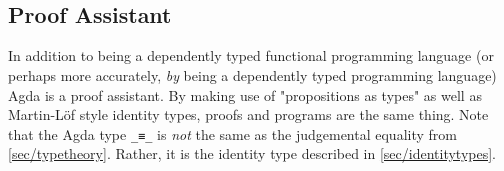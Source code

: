 \begin{code}%
\>[0]\AgdaOperator{\AgdaFunction{\AgdaUnderscore{}++\AgdaUnderscore{}}}\AgdaSpace{}%
\AgdaSymbol{:}\AgdaSpace{}%
\AgdaSymbol{\{}\AgdaSpace{}%
\AgdaSymbol{:}\AgdaSpace{}%
\AgdaSymbol{\}}\AgdaSpace{}%
\AgdaSymbol{\{}\AgdaSpace{}%
\AgdaSpace{}%
\AgdaSymbol{:}\AgdaSpace{}%
\AgdaSymbol{\}}\AgdaSpace{}%
\AgdaSpace{}%
\AgdaSpace{}%
\AgdaSpace{}%
\AgdaSpace{}%
\AgdaSpace{}%
\AgdaSpace{}%
\AgdaSpace{}%
\AgdaSpace{}%
\AgdaSpace{}%
\AgdaSpace{}%
\AgdaSpace{}%
\AgdaSymbol{(}\AgdaSpace{}%
\AgdaOperator{\AgdaFunction{+}}\AgdaSpace{}%
\AgdaSymbol{)}\<%
\\
\>[0]\AgdaInductiveConstructor{[]}\AgdaSpace{}%
\AgdaOperator{\AgdaFunction{++}}\AgdaSpace{}%
\AgdaSpace{}%
\AgdaSymbol{=}\AgdaSpace{}%
\<%
\\
\>[0]\AgdaSymbol{(}\AgdaSpace{}%
\AgdaOperator{\AgdaInductiveConstructor{::}}\AgdaSpace{}%
\AgdaSymbol{)}\AgdaSpace{}%
\AgdaOperator{\AgdaFunction{++}}\AgdaSpace{}%
\AgdaSpace{}%
\AgdaSymbol{=}\AgdaSpace{}%
\AgdaSpace{}%
\AgdaOperator{\AgdaInductiveConstructor{::}}\AgdaSpace{}%
\AgdaSymbol{(}\AgdaSpace{}%
\AgdaOperator{\AgdaFunction{++}}\AgdaSpace{}%
\AgdaSymbol{)}\<%
\end{code}
\subsection{Proof Assistant}

In addition to being a dependently typed functional programming language
(or perhaps more accurately, \emph{by} being a dependently typed programming language)
Agda is a proof assistant. By making use of "propositions as types" as well as Martin-Löf style
identity types, proofs and programs are the same thing.
Note that the Agda type \texttt{\_≡\_} is \emph{not} the same as the judgemental equality from \autoref{sec/typetheory}.
Rather, it is the identity type described in \autoref{sec/identitytypes}.

